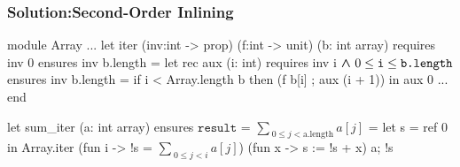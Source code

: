 %
%

\subsubsection*{Solution:Second-Order Inlining}
\begin{frame}[fragile]
\vspace*{0em}
\begin{footnotesize}
\begin{whycode} 
module Array 
... 
   let iter (inv:int -> prop) (f:int -> unit) (b: int array)
   requires { inv 0 } 
   ensures  { inv b.length } 
   = let rec aux (i: int)
     requires { inv i$\boldsymbol{~\wedge~} 0 \leq \texttt{i} \leq \texttt{b.length}$ }
     ensures  { inv b.length }
     = if i < Array.length b
       then (f b[i] ; aux (i + 1)) 
     in aux 0
...
end

let sum_iter (a: int array) 
ensures { $\texttt{result = }\sum_{~0 \leq j < \text{a.length}} a[j]$ }
= let s = ref 0 in
  Array.iter 
    (fun i -> !s = $\sum_{~0\leq j < i} a[j]$) (fun x -> s := !s + x) a; 
  !s
\end{whycode} 
\end{footnotesize}
\end{frame}
\addtocounter{framenumber}{-1}




